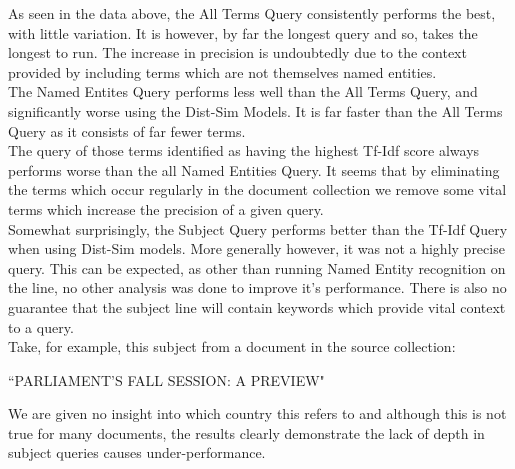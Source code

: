 \documentclass{l4proj}
\begin{document}
As seen in the data above, the All Terms Query consistently performs the best, with little variation. It is however, by far the longest query and so, takes the longest to run. The increase in precision is undoubtedly due to the context provided by including terms which are not themselves named entities. \\
The Named Entites Query performs less well than the All Terms Query, and significantly worse using the Dist-Sim Models. It is far faster than the All Terms Query as it consists of far fewer terms. \\
The query of those terms identified as having the highest Tf-Idf score always performs worse than the all Named Entities Query. It seems that by eliminating the terms which occur regularly in the document collection we remove some vital terms which increase the precision of a given query. \\
Somewhat surprisingly, the Subject Query performs better than the Tf-Idf Query when using Dist-Sim models. More generally however, it was not a highly precise query.  This can be expected, as other than running Named Entity recognition on the line, no other analysis was done to improve it's performance. There is also no guarantee that the subject line will contain keywords which provide vital context to a query.\\
Take, for example, this subject from a document in the source collection:
\begin{center}``PARLIAMENT'S FALL SESSION: A PREVIEW"\end{center}
We are given no insight into which country this refers to and although this is not true for many documents, the results clearly demonstrate the lack of depth in subject queries causes under-performance.\\
\end{document}
